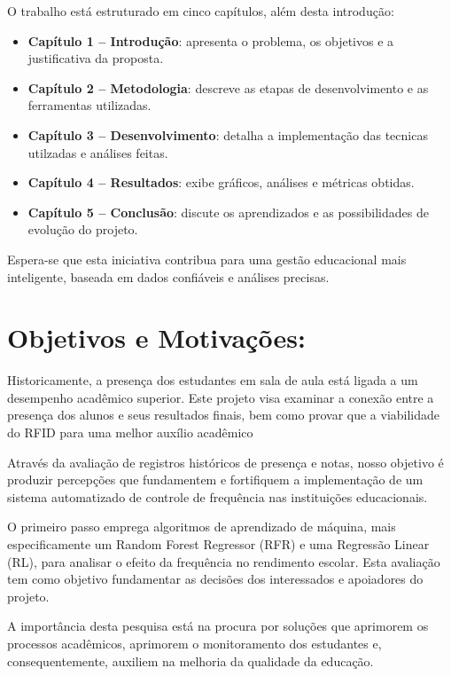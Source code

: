 \documentclass[
  letterpaper,
  DIV=11,
  numbers=noendperiod,
  openany]{scrreprt}
\providecommand{\tightlist}{%
  \setlength{\itemsep}{0pt}\setlength{\parskip}{0pt}}
\begin{document}
O trabalho está estruturado em cinco capítulos, além desta introdução:

\begin{itemize}
\tightlist
\item
  \textbf{Capítulo 1 -- Introdução}: apresenta o problema, os objetivos
  e a justificativa da proposta.
\item
  \textbf{Capítulo 2 -- Metodologia}: descreve as etapas de
  desenvolvimento e as ferramentas utilizadas.
\item
  \textbf{Capítulo 3 -- Desenvolvimento}: detalha a implementação das
  tecnicas utilzadas e análises feitas.
\item
  \textbf{Capítulo 4 -- Resultados}: exibe gráficos, análises e métricas
  obtidas.
\item
  \textbf{Capítulo 5 -- Conclusão}: discute os aprendizados e as
  possibilidades de evolução do projeto.
\end{itemize}

Espera-se que esta iniciativa contribua para uma gestão educacional mais
inteligente, baseada em dados confiáveis e análises precisas.


\chapter{Objetivos e Motivações:}\label{objetivos-e-motivauxe7uxf5es}

Historicamente, a presença dos estudantes em sala de aula está ligada a
um desempenho acadêmico superior. Este projeto visa examinar a conexão
entre a presença dos alunos e seus resultados finais, bem como provar
que a viabilidade do RFID para uma melhor auxílio acadêmico

Através da avaliação de registros históricos de presença e notas, nosso
objetivo é produzir percepções que fundamentem e fortifiquem a
implementação de um sistema automatizado de controle de frequência nas
instituições educacionais.

O primeiro passo emprega algoritmos de aprendizado de máquina, mais
especificamente um Random Forest Regressor (RFR) e uma Regressão Linear
(RL), para analisar o efeito da frequência no rendimento escolar. Esta
avaliação tem como objetivo fundamentar as decisões dos interessados e
apoiadores do projeto.

A importância desta pesquisa está na procura por soluções que aprimorem
os processos acadêmicos, aprimorem o monitoramento dos estudantes e,
consequentemente, auxiliem na melhoria da qualidade da educação.
\end{document}
